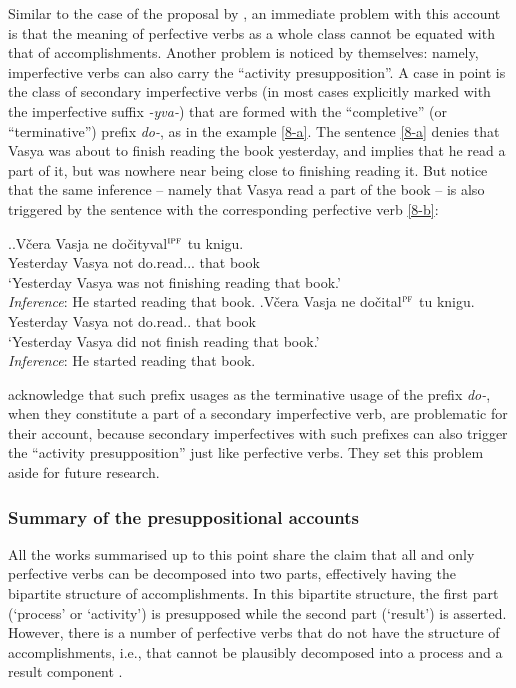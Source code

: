 Similar to the case of the proposal by \citet{Romanova:06}, an immediate problem with this account is that the meaning of perfective verbs as a whole class cannot be equated with that of accomplishments. Another problem is noticed by \citet{Docekal:09} themselves: namely, imperfective verbs can also carry the ``activity presupposition''. A case in point is the class of secondary imperfective verbs (in most cases explicitly marked with the imperfective suffix \textit{-yva-}) that are formed with the ``completive'' (or ``terminative'') prefix \textit{do-}, as in the example \ref{8-a}. The sentence \ref{8-a} denies that Vasya was about to finish reading the book yesterday, and implies that he read a part of it, but was nowhere near being close to finishing reading it. But notice that the same inference -- namely that Vasya read a part of the book -- is also triggered by the sentence with the corresponding perfective verb \ref{8-b}:

\ex.\label{8}\ag.\label{8-a}V\v{c}era Vasja ne do\v{c}ityval$^{\textsc{ipf}}$ tu knigu.\\
Yesterday Vasya not do.read... that book\\
\trans `Yesterday Vasya was not finishing reading that book.'\\
\textit{Inference}: He started reading that book.
\bg.\label{8-b}V\v{c}era Vasja ne do\v{c}ital$^{\textsc{pf}}$ tu knigu.\\
Yesterday Vasya not do.read.. that book\\
\trans `Yesterday Vasya did not finish reading that book.'\\
\textit{Inference}: He started reading that book.

\citet{Docekal:09} acknowledge that such prefix usages as the terminative usage of the prefix \textit{do-}, when they constitute a part of a secondary imperfective verb, are problematic for their account, because secondary imperfectives with such prefixes can also trigger the ``activity presupposition'' just like perfective verbs. They set this problem aside for future research. 

\subsubsection{Summary of the presuppositional accounts}
All the works summarised up to this point share the claim that all and only perfective verbs can be decomposed into two parts, effectively having the bipartite structure of accomplishments. In this bipartite structure, the first part (`process' or `activity') is presupposed while the second part (`result') is asserted. However, there is a number of perfective verbs that do not have the structure of accomplishments, i.e., that cannot be plausibly decomposed into a process and a result component \citep[see][and references therein]{Filip:00, FilipRothstein:05}. 

